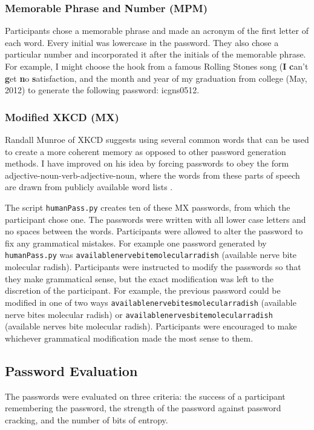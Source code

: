 \documentclass{article}
\begin{document}
\subsubsection*{Memorable Phrase and Number (MPM)}
Participants chose a memorable phrase and made an acronym of the first letter of each word. Every initial was lowercase in the password. They also chose a particular number and incorporated it after the initials of the memorable phrase. For example, I might choose the hook from a famous Rolling Stones song (\textbf{I} \textbf{c}an't \textbf{g}et \textbf{n}o \textbf{s}atisfaction, and the month and year of my graduation from college (May, 2012) to generate the following password: icgns0512. 

\subsubsection*{Modified XKCD (MX)}
Randall Munroe of XKCD suggests using several common words that can be used to create a more coherent memory as opposed to other password generation methods. I have improved on his idea by forcing passwords to obey the form adjective-noun-verb-adjective-noun, where the words from these parts of speech are drawn from publicly available word lists \cite{nouns, adjectives, verbs}.

The script \texttt{humanPass.py} creates ten of these MX passwords, from which the participant chose one. The passwords were written with all lower case letters and no spaces between the words. Participants were allowed to alter the password to fix any grammatical mistakes. For example one password generated by \texttt{humanPass.py} was \texttt{availablenervebitemolecularradish} (available nerve bite molecular radish). Participants were instructed to modify the passwords so that they make grammatical sense, but the exact modification was left to the discretion of the participant. For example, the previous password could be modified in one of two ways \texttt{availablenervebitesmolecularradish} (available nerve bites molecular radish) or \texttt{availablenervesbitemolecularradish} (available nerves bite molecular radish). Participants were encouraged to make whichever grammatical modification made the most sense to them.

\subsection*{Password Evaluation}
The passwords were evaluated on three criteria: the success of a participant remembering the password, the strength of the password against password cracking, and the number of bits of entropy.
\end{document}

